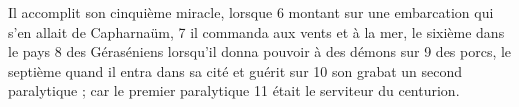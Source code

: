 Il accomplit son cinquième miracle, lorsque	 
6	 	montant sur une embarcation qui s'en allait de Capharnaüm,	 
7	 	il commanda aux vents et à la mer, le sixième dans le pays	 
8	 	des Géraséniens lorsqu'il donna pouvoir à des démons sur	 
9	 	des porcs, le septième quand il entra dans sa cité et guérit sur	 
10	 	son grabat un second paralytique ; car le premier paralytique	 
11	 	était le serviteur du centurion.